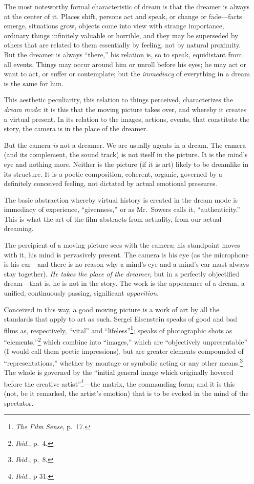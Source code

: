 \documentclass{tufte-handout}
\begin{document}
The most noteworthy formal characteristic of dream is that the dreamer
is always at the center of it. Places shift, persons act and speak, or
change or fade---facts emerge, situations grow, objects come into view
with strange importance, ordinary things infinitely valuable or
horrible, and they may be superseded by others that are related to them
essen­tially by feeling, not by natural proximity. But the dreamer is
always ``there,'' his relation is, so to speak, equidistant from all
events. Things may occur around him or unroll before his eyes; he may
act or want to act, or suffer or contemplate; but the \emph{immediacy}
of everything in a dream is the same for him.

This aesthetic peculiarity, this relation to things perceived,
char­acterizes the \emph{dream mode}: it is this that the moving picture
takes over, and whereby it creates a virtual present. In its relation to
the images, actions, events, that constitute the story, the camera is in
the place of the dreamer.

But the camera \emph{is} not a dreamer. We are usually agents in a
dream. The camera (and its complement, the sound track) is not itself in
the picture. It is the mind's eye and nothing more. Neither is the
picture (if it is art) likely to be dreamlike in its structure. It is a
poetic com­position, coherent, organic, governed by a definitely
conceived feeling, not dictated by actual emotional pressures.

The basic abstraction whereby virtual history is created in the dream
mode is immediacy of experience, ``givenness,'' or as Mr.~Sowers calls
it, ``authenticity.'' This is what the art of the film abstracts from
actu­ality, from our actual dreaming.

The percipient of a moving picture sees with the camera; his stand­point
moves with it, his mind is pervasively present. The camera is his eye
(as the microphone is his ear---and there is no reason why a mind's eye
and a mind's ear must always stay together). \emph{He takes the place of
the dreamer}, but in a perfectly objectified dream---that is, he is not
in the story. The work is the appearance of a dream, a unified,
continu­ously passing, significant \emph{apparition}.

Conceived in this way, a good moving picture is a work of art by all the
standards that apply to art as such. Sergei Eisenstein speaks of good
and bad films as, respectively, ``vital'' and ``lifeless''\footnote{\emph{The
  Film Sense}, p.~17.}; speaks of photographic shots as
``elements,''\footnote{\emph{Ibid.}, p.~4.} which combine into
``images,'' which are ``objectively unpresentable'' (I would call them
poetic impressions), but are greater elements compounded of
``representations,'' whether by mon­tage or symbolic acting or any other
means.\footnote{\emph{Ibid.}, p.~8.} The whole is governed by the
``initial general image which originally hovered before the creative
artist''\footnote{\emph{Ibid.}, p 31.}---the matrix, the commanding
form; and it is this (not, be it remarked, the artist's emotion) that is
to be evoked in the mind of the spectator.
\end{document}
